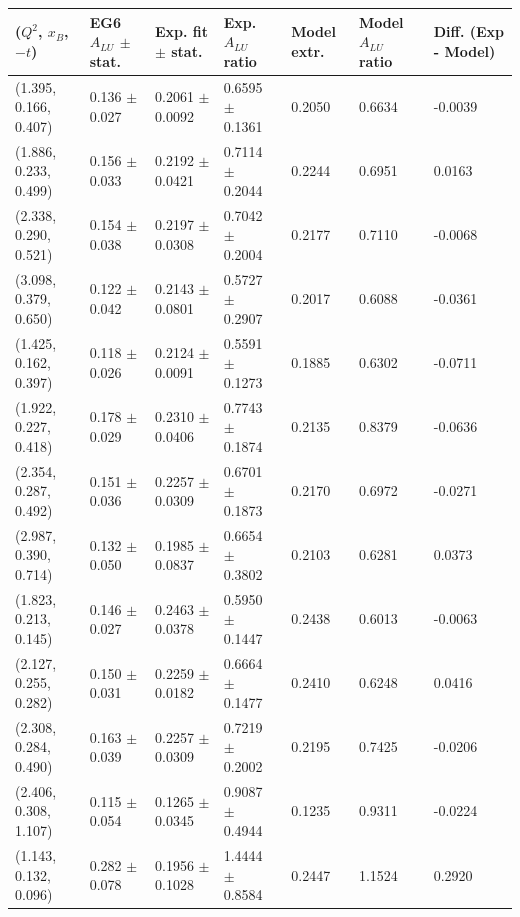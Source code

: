 \begin{landscape}
\begin{table}[!h]
   \begin{center}
      \begin{tabular}{||l|l|l|l|l|l|l||}
         \hline
 ($Q^{2}$, $x_{B}$, $-t$) & EG6 $A_{LU}$ $\pm$ stat. &  Exp. fit $\pm$ stat. & Exp. $A_{LU}$ ratio   &  Model extr. & Model $A_{LU}$ ratio &  Diff. (Exp - Model)    \\
  \hline
 (1.395, 0.166, 0.407) &  0.136 $\pm$ 0.027 & 0.2061 $\pm$ 0.0092 & 0.6595 $\pm$ 0.1361 & 0.2050 & 0.6634 & -0.0039 \\
 (1.886, 0.233, 0.499) &  0.156 $\pm$ 0.033 & 0.2192 $\pm$ 0.0421 & 0.7114 $\pm$ 0.2044 & 0.2244 & 0.6951 &  0.0163 \\
 (2.338, 0.290, 0.521) &  0.154 $\pm$ 0.038 & 0.2197 $\pm$ 0.0308 & 0.7042 $\pm$ 0.2004 & 0.2177 & 0.7110 & -0.0068 \\
 (3.098, 0.379, 0.650) &  0.122 $\pm$ 0.042 & 0.2143 $\pm$ 0.0801 & 0.5727 $\pm$ 0.2907 & 0.2017 & 0.6088 & -0.0361 \\
   \hline \hline  \hline
 (1.425, 0.162, 0.397) &  0.118 $\pm$ 0.026 & 0.2124 $\pm$ 0.0091 & 0.5591 $\pm$ 0.1273 & 0.1885 & 0.6302 & -0.0711 \\
 (1.922, 0.227, 0.418) &  0.178 $\pm$ 0.029 & 0.2310 $\pm$ 0.0406 & 0.7743 $\pm$ 0.1874 & 0.2135 & 0.8379 & -0.0636 \\
 (2.354, 0.287, 0.492) &  0.151 $\pm$ 0.036 & 0.2257 $\pm$ 0.0309 & 0.6701 $\pm$ 0.1873 & 0.2170 & 0.6972 & -0.0271 \\
 (2.987, 0.390, 0.714) &  0.132 $\pm$ 0.050 & 0.1985 $\pm$ 0.0837 & 0.6654 $\pm$ 0.3802 & 0.2103 & 0.6281 &  0.0373 \\
   \hline  \hline  \hline
 (1.823, 0.213, 0.145) &  0.146 $\pm$ 0.027 & 0.2463 $\pm$ 0.0378 & 0.5950 $\pm$ 0.1447 & 0.2438 & 0.6013 & -0.0063 \\
 (2.127, 0.255, 0.282) &  0.150 $\pm$ 0.031 & 0.2259 $\pm$ 0.0182 & 0.6664 $\pm$ 0.1477 & 0.2410 & 0.6248 &  0.0416 \\
 (2.308, 0.284, 0.490) &  0.163 $\pm$ 0.039 & 0.2257 $\pm$ 0.0309 & 0.7219 $\pm$ 0.2002 & 0.2195 & 0.7425 & -0.0206 \\
 (2.406, 0.308, 1.107) &  0.115 $\pm$ 0.054 & 0.1265 $\pm$ 0.0345 & 0.9087 $\pm$ 0.4944 & 0.1235 & 0.9311 & -0.0224 \\
   \hline  \hline  \hline
 (1.143, 0.132, 0.096) &  0.282 $\pm$ 0.078 & 0.1956 $\pm$ 0.1028 & 1.4444 $\pm$ 0.8584 & 0.2447 & 1.1524 &  0.2920 \\

\end{tabular}
\end{center}
\end{table}
\end{landscape}
